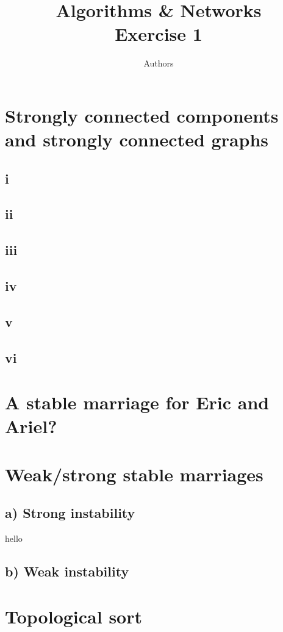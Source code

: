 \documentclass[a4paper]{article}
\author{Authors}
\title{Algorithms \& Networks \\ Exercise 1}
\begin{document}
\maketitle
\section{Strongly connected components and strongly connected graphs}
\subsection*{i}
\subsection*{ii}
\subsection*{iii}
\subsection*{iv}
\subsection*{v}
\subsection*{vi}

\section{A stable marriage for Eric and Ariel?}

\section{Weak/strong stable marriages}
\subsection*{a) Strong instability}
hello
\subsection*{b) Weak instability}

\section{Topological sort}
\end{document}
